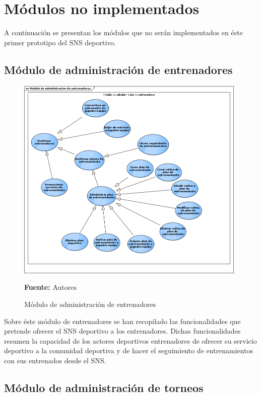 \chapter{Módulos no implementados}
\label{app:cu_no_implementados}

A continuación se presentan los módulos que no serán implementados en éste primer prototipo del SNS deportivo.

\section{Módulo de administración de entrenadores}

\begin{figure}[!htb]
  \begin{center}
    \includegraphics[width=11cm]{./imagenes/casos_uso/gestion_entrenador.png}
    \caption{Módulo de administración de entrenadores}
    \label{fig:cu_admin_ent}
    \textbf{Fuente:} Autores \\
  \end{center}
\end{figure}

Sobre éste módulo de entrenadores se han recopilado las funcionalidades que pretende ofrecer el SNS deportivo a los entrenadores. Dichas funcionalidades resumen la capacidad de los actores deportivos entrenadores de ofrecer su servicio deportivo a la comunidad deportiva y de hacer el seguimiento de entrenamientos con sus entrenados desde el SNS.

\section{Módulo de administración de torneos}

